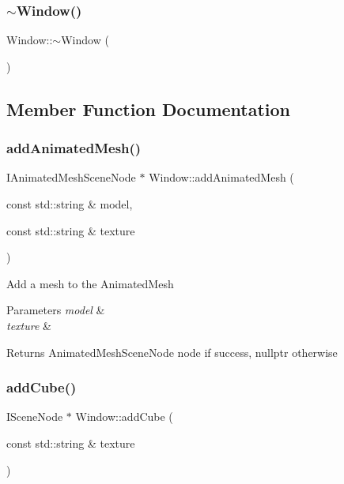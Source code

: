 \subsubsection{\texorpdfstring{$\sim$Window()}{~Window()}}
{\footnotesize\ttfamily Window\+::$\sim$\+Window (\begin{DoxyParamCaption}{ }\end{DoxyParamCaption})}



\subsection{Member Function Documentation}
\mbox{\label{class_window_acde6f6a5b6c11782ec5e59f895a25ce7}} 
\subsubsection{\texorpdfstring{addAnimatedMesh()}{addAnimatedMesh()}}
{\footnotesize\ttfamily I\+Animated\+Mesh\+Scene\+Node $\ast$ Window\+::add\+Animated\+Mesh (\begin{DoxyParamCaption}\item[{const std\+::string \&}]{model,  }\item[{const std\+::string \&}]{texture }\end{DoxyParamCaption})}

Add a mesh to the Animated\+Mesh 
\begin{DoxyParams}{Parameters}
{\em model} & \\
\hline
{\em texture} & \\
\hline
\end{DoxyParams}
\begin{DoxyReturn}{Returns}
Animated\+Mesh\+Scene\+Node node if success, nullptr otherwise 
\end{DoxyReturn}
\mbox{\label{class_window_a4741a5d47dd6887f7c3b92beda15f0cc}} 
\subsubsection{\texorpdfstring{addCube()}{addCube()}}
{\footnotesize\ttfamily I\+Scene\+Node $\ast$ Window\+::add\+Cube (\begin{DoxyParamCaption}\item[{const std\+::string \&}]{texture }\end{DoxyParamCaption})}

